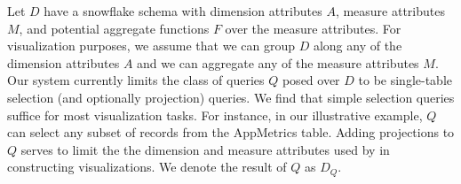 
Let $D$ have a snowflake schema with 
dimension attributes $A$, measure attributes $M$, and potential
aggregate functions $F$ over the measure attributes. 
For visualization purposes, we assume that we can group $D$ along any of the dimension attributes $A$ 
and we can aggregate any of the measure attributes $M$.
Our system currently limits the class of queries $Q$ posed over $D$ to be single-table
selection (and optionally projection) queries.
We find that simple selection queries suffice for most visualization tasks.
For instance, in our illustrative example, $Q$ can select any subset of records from the
AppMetrics table. 
Adding projections to $Q$ serves to limit the the dimension and measure 
attributes used by \SeeDB in constructing visualizations.
We denote the result of $Q$ as $D_Q$.
\fi


